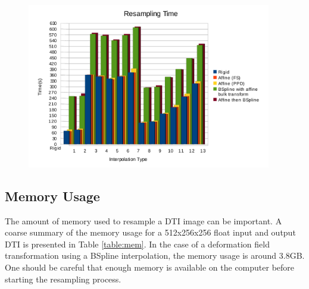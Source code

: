 \documentclass{InsightArticle}
\begin{document}
\begin{figure}
\center
\includegraphics[width=0.95\textwidth]{Screenshot-results-graph3.png}
\label{fig:ResamplingTime}
\end{figure}

\subsection{Memory Usage}
The amount of memory used to resample a DTI image can be important. A coarse summary of the memory usage for a 512x256x256 float input and output DTI is presented in Table \ref{table:mem}. In the case of a deformation field transformation using a BSpline interpolation, the memory usage is around 3.8GB. One should be careful that enough memory is available on the computer before starting the resampling process.
\end{document}
